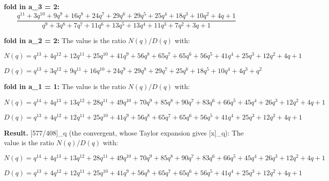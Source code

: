\documentclass[11pt]{article}
\begin{document}
\noindent\textbf{fold in a\_3 = 2:}
{\footnotesize%
\begin{dmath*}
\frac{q^{11} + 3 q^{10} + 9 q^{9} + 16 q^{8} + 24 q^{7} + 29 q^{6} + 29 q^{5} + 25 q^{4} + 18 q^{3} + 10 q^{2} + 4 q + 1}{q^{9} + 3 q^{8} + 7 q^{7} + 11 q^{6} + 13 q^{5} + 13 q^{4} + 11 q^{3} + 7 q^{2} + 3 q + 1}
\end{dmath*}
}

\noindent\textbf{fold in a\_2 = 2:}
\noindent The value is the ratio $N(q)/D(q)$ with:\par
{\footnotesize%
\begin{dmath*}
N(q) = q^{13} + 4 q^{12} + 12 q^{11} + 25 q^{10} + 41 q^{9} + 56 q^{8} + 65 q^{7} + 65 q^{6} + 56 q^{5} + 41 q^{4} + 25 q^{3} + 12 q^{2} + 4 q + 1
\end{dmath*}
}

{\footnotesize%
\begin{dmath*}
D(q) = q^{13} + 3 q^{12} + 9 q^{11} + 16 q^{10} + 24 q^{9} + 29 q^{8} + 29 q^{7} + 25 q^{6} + 18 q^{5} + 10 q^{4} + 4 q^{3} + q^{2}
\end{dmath*}
}

\noindent\textbf{fold in a\_1 = 1:}
\noindent The value is the ratio $N(q)/D(q)$ with:\par
{\footnotesize%
\begin{dmath*}
N(q) = q^{14} + 4 q^{13} + 13 q^{12} + 28 q^{11} + 49 q^{10} + 70 q^{9} + 85 q^{8} + 90 q^{7} + 83 q^{6} + 66 q^{5} + 45 q^{4} + 26 q^{3} + 12 q^{2} + 4 q + 1
\end{dmath*}
}

{\footnotesize%
\begin{dmath*}
D(q) = q^{13} + 4 q^{12} + 12 q^{11} + 25 q^{10} + 41 q^{9} + 56 q^{8} + 65 q^{7} + 65 q^{6} + 56 q^{5} + 41 q^{4} + 25 q^{3} + 12 q^{2} + 4 q + 1
\end{dmath*}
}

\noindent\textbf{Result.} [577/408]\_q (the convergent, whose Taylor expansion gives [x]\_q):
\noindent The value is the ratio $N(q)/D(q)$ with:\par
{\footnotesize%
\begin{dmath*}
N(q) = q^{14} + 4 q^{13} + 13 q^{12} + 28 q^{11} + 49 q^{10} + 70 q^{9} + 85 q^{8} + 90 q^{7} + 83 q^{6} + 66 q^{5} + 45 q^{4} + 26 q^{3} + 12 q^{2} + 4 q + 1
\end{dmath*}
}

{\footnotesize%
\begin{dmath*}
D(q) = q^{13} + 4 q^{12} + 12 q^{11} + 25 q^{10} + 41 q^{9} + 56 q^{8} + 65 q^{7} + 65 q^{6} + 56 q^{5} + 41 q^{4} + 25 q^{3} + 12 q^{2} + 4 q + 1
\end{dmath*}
}
\end{document}

